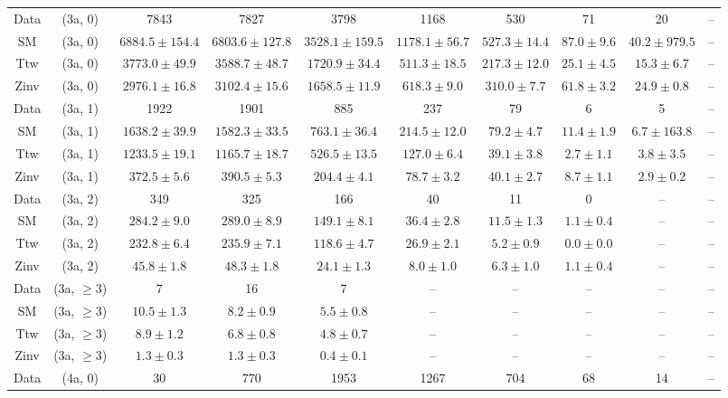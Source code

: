 \begin{table}[h!]
{\begin{tabular}{cccccccccc}
	Data & (3a, 0) & 7843 & 7827 & 3798 & 1168 & 530 & 71 & 20 & -- \\[0.5ex] 
	SM & (3a, 0) & $6884.5\pm 154.4$ & $6803.6\pm 127.8$ & $3528.1\pm 159.5$ & $1178.1\pm 56.7$ & $527.3\pm 14.4$ & $87.0\pm 9.6$ & $40.2\pm 979.5$ & -- \\[0.5ex] 
	Ttw & (3a, 0) & $3773.0\pm 49.9$ & $3588.7\pm 48.7$ & $1720.9\pm 34.4$ & $511.3\pm 18.5$ & $217.3\pm 12.0$ & $25.1\pm 4.5$ & $15.3\pm 6.7$ & -- \\[0.5ex] 
	Zinv & (3a, 0) & $2976.1\pm 16.8$ & $3102.4\pm 15.6$ & $1658.5\pm 11.9$ & $618.3\pm 9.0$ & $310.0\pm 7.7$ & $61.8\pm 3.2$ & $24.9\pm 0.8$ & -- \\[0.5ex] 
	Data & (3a, 1) & 1922 & 1901 & 885 & 237 & 79 & 6 & 5 & -- \\[0.5ex] 
	SM & (3a, 1) & $1638.2\pm 39.9$ & $1582.3\pm 33.5$ & $763.1\pm 36.4$ & $214.5\pm 12.0$ & $79.2\pm 4.7$ & $11.4\pm 1.9$ & $6.7\pm 163.8$ & -- \\[0.5ex] 
	Ttw & (3a, 1) & $1233.5\pm 19.1$ & $1165.7\pm 18.7$ & $526.5\pm 13.5$ & $127.0\pm 6.4$ & $39.1\pm 3.8$ & $2.7\pm 1.1$ & $3.8\pm 3.5$ & -- \\[0.5ex] 
	Zinv & (3a, 1) & $372.5\pm 5.6$ & $390.5\pm 5.3$ & $204.4\pm 4.1$ & $78.7\pm 3.2$ & $40.1\pm 2.7$ & $8.7\pm 1.1$ & $2.9\pm 0.2$ & -- \\[0.5ex] 
	Data & (3a, 2) & 349 & 325 & 166 & 40 & 11 & 0 & -- & -- \\[0.5ex] 
	SM & (3a, 2) & $284.2\pm 9.0$ & $289.0\pm 8.9$ & $149.1\pm 8.1$ & $36.4\pm 2.8$ & $11.5\pm 1.3$ & $1.1\pm 0.4$ & -- & -- \\[0.5ex] 
	Ttw & (3a, 2) & $232.8\pm 6.4$ & $235.9\pm 7.1$ & $118.6\pm 4.7$ & $26.9\pm 2.1$ & $5.2\pm 0.9$ & $0.0\pm 0.0$ & -- & -- \\[0.5ex] 
	Zinv & (3a, 2) & $45.8\pm 1.8$ & $48.3\pm 1.8$ & $24.1\pm 1.3$ & $8.0\pm 1.0$ & $6.3\pm 1.0$ & $1.1\pm 0.4$ & -- & -- \\[0.5ex] 
	Data & (3a, $\ge3$) & 7 & 16 & 7 & -- & -- & -- & -- & -- \\[0.5ex] 
	SM & (3a, $\ge3$) & $10.5\pm 1.3$ & $8.2\pm 0.9$ & $5.5\pm 0.8$ & -- & -- & -- & -- & -- \\[0.5ex] 
	Ttw & (3a, $\ge3$) & $8.9\pm 1.2$ & $6.8\pm 0.8$ & $4.8\pm 0.7$ & -- & -- & -- & -- & -- \\[0.5ex] 
	Zinv & (3a, $\ge3$) & $1.3\pm 0.3$ & $1.3\pm 0.3$ & $0.4\pm 0.1$ & -- & -- & -- & -- & -- \\[0.5ex] 
	Data & (4a, 0) & 30 & 770 & 1953 & 1267 & 704 & 68 & 14 & -- \\[0.5ex] 

\end{tabular}}
\end{table}
